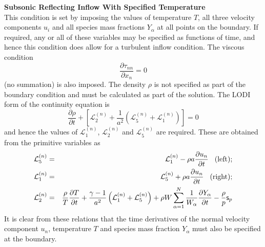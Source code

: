 \documentclass[dvips]{article}
\begin{document}
\vspace{2mm}
\noindent
{\bf Subsonic Reflecting Inflow With Specified Temperature}\\
This condition is set by imposing the values of temperature $T$, all three
velocity components $u_{i}$ and all species mass fractions $Y_{\alpha}$ at all
points on the boundary.  If required, any or all of these variables may be
specified as functions of time, and hence this condition does allow for
a turbulent inflow condition.  The viscous condition
\begin{equation}
\frac{\partial \tau_{nn}}{\partial x_{n}} = 0
\end{equation}
(no summation) is also imposed.
The density $\rho$ is not specified as part of the boundary condition
and must be calculated as part of the solution.  The LODI form of the
continuity equation is
\begin{equation}
\frac{\partial\rho}{\partial t} + \left[{\mathcal L}^{(n)}_{2} +
\frac{1}{a^{2}}\left({\mathcal L}^{(n)}_{5}
                    +{\mathcal L}^{(n)}_{1}\right)\right] = 0
\end{equation}
and hence the values of ${\mathcal L}^{(n)}_{1}$, ${\mathcal L}^{(n)}_{2}$
and ${\mathcal L}^{(n)}_{5}$ are required.  These are obtained from the
primitive variables as
\begin{eqnarray}
{\mathcal L}^{(n)}_{5} & = &
{\mathcal L}^{(n)}_{1} - \rho a\frac{\partial u_{n}}{\partial t}
\hspace{3mm}{\rm (left);}
\nonumber \\
{\mathcal L}^{(n)}_{1} & = &
{\mathcal L}^{(n)}_{5} + \rho a\frac{\partial u_{n}}{\partial t}
\hspace{3mm}{\rm (right);}
\nonumber \\
{\mathcal L}^{(n)}_{2} & = &
\frac{\rho}{T}\frac{\partial T}{\partial t}
+\frac{\gamma-1}{a^{2}}
\left({\mathcal L}^{(n)}_{1}+{\mathcal L}^{(n)}_{5}\right)
+\rho W\sum_{\alpha=1}^{N}
\frac{1}{W_{\alpha}}\frac{\partial Y_{\alpha}}{\partial t}
-\frac{\rho}{p}{\mathsf s}_{p}
\label{NSCBCTEMP}
\end{eqnarray}
It is clear from these relations that the time derivatives of the normal
velocity component $u_{n}$, temperature $T$ and species mass fraction
$Y_{\alpha}$ must also be specified at the boundary.
\end{document}
